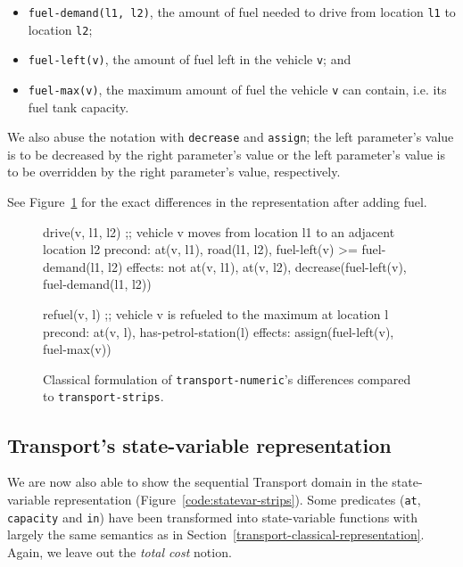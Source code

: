 \begin{itemize}
\item \verb+fuel-demand(l1, l2)+, the amount of fuel needed to drive
from location \verb+l1+ to location \verb+l2+;
\item \verb+fuel-left(v)+, the amount of fuel left in
the vehicle \verb+v+; and
\item \verb+fuel-max(v)+, the maximum amount of fuel
the vehicle \verb+v+ can contain, i.e. its fuel tank capacity.
\end{itemize}



We also abuse the notation with \verb+decrease+ and \verb+assign+;
the left parameter's value is to be decreased by the right
parameter's value or the left parameter's value is to be overridden
by the right parameter's value, respectively.

See Figure~\ref{code:classical-numeric} for the exact differences
in the representation after adding fuel.

\begin{figure}[tbp]
\begin{code}
drive(v, l1, l2)
  ;; vehicle v moves from location l1 to an adjacent location l2
  precond: at(v, l1), road(l1, l2), fuel-left(v) >= fuel-demand(l1, l2)
  effects: not at(v, l1), at(v, l2),
           decrease(fuel-left(v),  fuel-demand(l1, l2))
  
refuel(v, l)
  ;; vehicle v is refueled to the maximum at location l
  precond: at(v, l), has-petrol-station(l)
  effects: assign(fuel-left(v), fuel-max(v))
\end{code}
\caption[Partial classical formulation of \texttt{transport-numeric}.]{Classical formulation of \texttt{transport-numeric}'s differences compared to \texttt{transport-strips}.}
\label{code:classical-numeric}
\end{figure}

\subsection{Transport's state-variable representation}

We are now also able to show the sequential Transport domain
in the state-variable representation (Figure~\ref{code:statevar-strips}).
Some predicates (\verb+at+, \verb+capacity+ and \verb+in+) have been transformed
into state-variable functions with largely the same semantics as in
Section~\ref{transport-classical-representation}. Again, we leave out
the \textit{total cost} notion.


